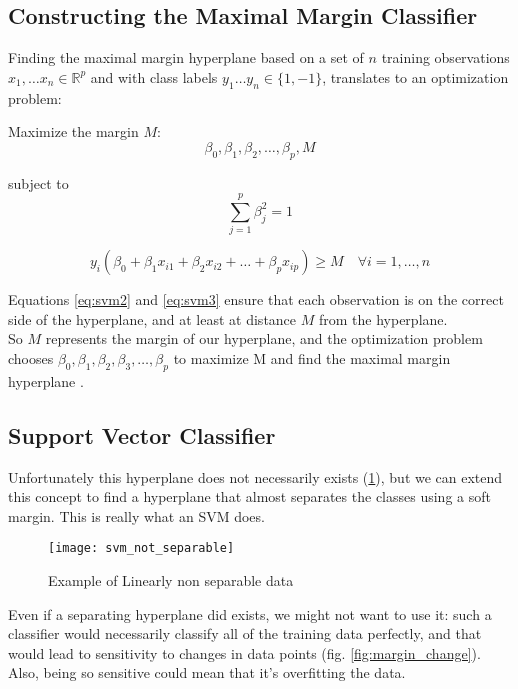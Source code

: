\subsection{Constructing the Maximal Margin Classifier}
Finding the maximal margin hyperplane based on a set of $n$ training observations $x_1, \dots x_n \in \mathbb{R}^p$ and with class labels $y_1 \dots y_n \in \{1, -1\}$, translates to an optimization problem:

Maximize the margin $M$:
\begin{equation} \label{eq:svm1}
	\beta_0, \beta_1, \beta_2, \dots, \beta_p, M
\end{equation}

subject to
\begin{equation} \label{eq:svm2}
	\sum_{j=1}^{p}\beta^2_j = 1
\end{equation}

\begin{equation} \label{eq:svm3}
	y_i(\beta_0 + \beta_1 x_{i1} + \beta_2 x_{i2} + \dots + \beta_p x_{ip}) \ge M \quad \forall i = 1, \dots, n
\end{equation}

Equations \ref{eq:svm2} and \ref{eq:svm3} ensure that each observation is on the correct side of the hyperplane, and at least at distance $M$ from the hyperplane. \\
So $M$ represents the margin of our hyperplane, and the optimization problem chooses $\beta_0, \beta_1, \beta_2, \beta_3, \dots, \beta_p$ to maximize M and find the maximal margin hyperplane \cite{ISLR}.

\subsection{Support Vector Classifier}
Unfortunately this hyperplane does not necessarily exists (\ref{fig:svmnotsep}), but we can extend this concept to find a hyperplane that almost separates the classes using a soft margin. This is really what an SVM does.

\begin{figure}[H]
	\centering
	\texttt{[image: svm\_not\_separable]}
	\caption{Example of Linearly non separable data \cite{svm_not_sep}}
	\label{fig:svmnotsep}
\end{figure}

Even if a separating hyperplane did exists, we might not want to use it: such a classifier would necessarily  classify all of the training data perfectly, and that would lead to sensitivity to changes in data points (fig. \ref{fig:margin_change}). Also, being so sensitive could mean that it's overfitting the data. 

